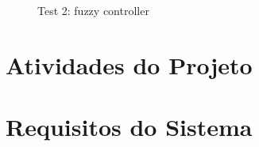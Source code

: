 \begin{multicols}{2}
            \begin{figure}[H]
                \centering
                \caption{Test 2: fuzzy controller}
                \label{fig:fuzzy_test2}
            \end{figure}

        \end{multicols}

\section{Atividades do Projeto}
\label{sec:metodo3}

\section {Requisitos do Sistema}
\label{sec:req}


\clearpage